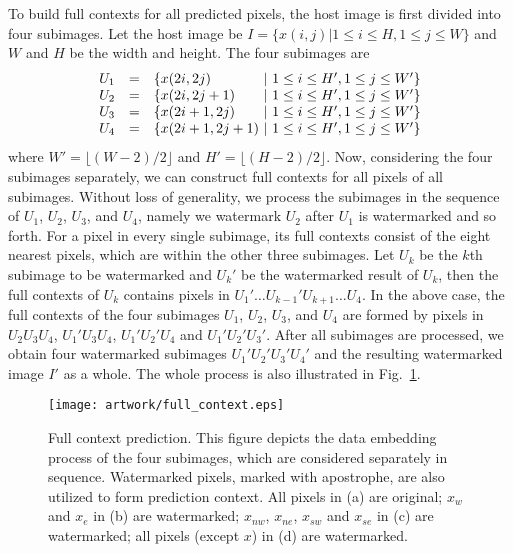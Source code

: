\documentclass[journal]{IEEEtran}
\begin{document}
To build full contexts for all predicted pixels, the host image is first divided into four
subimages. Let the host image be $I = \{x(i,j) | 1 \le i \le H, 1 \le j \le W\}$ and $W$ and $H$ be
the width and height. The four subimages are
\begin{equation}
    \begin{array}{l@{\quad=\quad}l@{\ |\ }l}
	U_1 & \{x(2i,2j) & 1 \le i \le H', 1 \le j \le W' \} \\ 
	U_2 & \{x(2i,2j+1) & 1 \le i \le H', 1 \le j \le W' \} \\ 
	U_3 & \{x(2i+1,2j) & 1 \le i \le H', 1 \le j \le W' \} \\ 
	U_4 & \{x(2i+1,2j+1) & 1 \le i \le H', 1 \le j \le W' \} \\ 
    \end{array}
\end{equation}
where $W'=\lfloor (W-2)/2 \rfloor$ and $H'=\lfloor (H-2)/2 \rfloor$. Now, considering the four
subimages separately, we can construct full contexts for all pixels of all subimages. Without loss
of generality, we process the subimages in the sequence of $U_1$, $U_2$, $U_3$, and $U_4$, namely we
watermark $U_2$ after $U_1$ is watermarked and so forth. For a pixel in every single subimage, its
full contexts consist of the eight nearest pixels, which are within the other three subimages. Let
$U_k$ be the $k$th subimage to be watermarked and $U_k'$ be the watermarked result of $U_k$, then
the full contexts of $U_k$ contains pixels in $U_1'\dots U_{k-1}'U_{k+1} \dots U_4$. In the above
case, the full contexts of the four subimages $U_1$, $U_2$, $U_3$, and $U_4$ are formed by pixels in
$U_2 U_3 U_4$, $U_1' U_3 U_4$, $U_1' U_2' U_4$ and $U_1' U_2' U_3'$. After all subimages are
processed, we obtain four watermarked subimages $U_1'U_2'U_3'U_4'$ and the resulting watermarked
image $I'$ as a whole. The whole process is also illustrated in Fig.\ \ref{fig:fullctx}.

\begin{figure}[t]
    \centering
    \texttt{[image: artwork/full\_context.eps]}
    \caption{\label{fig:fullctx}Full context prediction. This figure depicts the data embedding
    process of the four subimages, which are considered separately in sequence. Watermarked pixels,
    marked with apostrophe, are also utilized to form prediction context. All pixels in (a) are
    original; $x_w$ and $x_e$ in (b) are watermarked; $x_{nw}$, $x_{ne}$, $x_{sw}$ and $x_{se}$ in
    (c) are watermarked; all pixels (except $x$) in (d) are watermarked. }
\end{figure}
\end{document}
